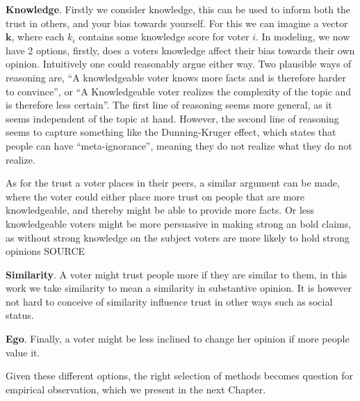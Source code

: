 \textbf{Knowledge}. Firstly we consider knowledge, this can be used to
inform both the trust in others, and your bias towards yourself. For this we
can imagine a vector $\boldsymbol{k}$, where each $k_i$ contains some knowledge
score for voter $i$. In modeling, we now have 2 options, firstly, does a voters
knowledge affect their bias towards their own opinion. Intuitively one could
reasonably argue either way. Two plausible ways of reasoning are, ``A
knowledgeable voter knows more facts and is therefore harder to convince'', or
``A Knowledgeable voter realizes the complexity of the topic and is therefore
less certain''. The first line of reasoning seems more general, as it seems
independent of the topic at hand. However, the second line of reasoning seems
to capture something like the Dunning-Kruger effect, which states that people
can have ``meta-ignorance'', meaning they do not realize what they do not realize.

As for the trust a voter places in their peers, a similar argument can be made,
where the voter could either place more trust on people that are more
knowledgeable, and thereby might be able to provide more facts. Or less
knowledgeable voters might be more persuasive in making strong an bold claims,
as without strong knowledge on the subject voters are more likely to hold
strong opinions SOURCE



\textbf{Similarity}. A voter might trust people more if they are similar to them, in this work we take similarity to mean a similarity in substantive opinion. It is however not hard to conceive of similarity influence trust in other ways such as social status.


\textbf{Ego}. Finally, a voter might be less inclined to change her opinion if
more people value it.

Given these different options, the right selection of methods becomes question
for empirical observation, which we present in the next Chapter.

